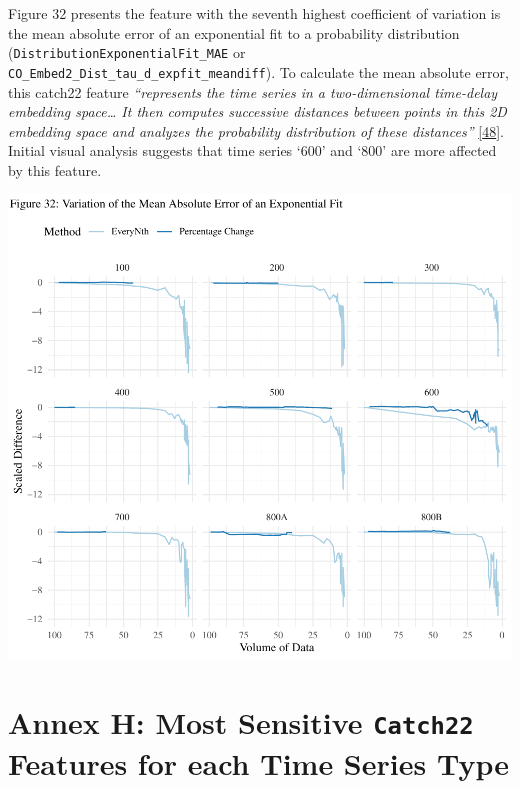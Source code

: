 \documentclass{article}
\begin{document}
\newpage

Figure 32 presents the feature with the seventh highest coefficient of
variation is the mean absolute error of an exponential fit to a
probability distribution (\texttt{DistributionExponentialFit\_MAE} or
\texttt{CO\_Embed2\_Dist\_tau\_d\_expfit\_meandiff}). To calculate the
mean absolute error, this catch22 feature \emph{``represents the time
series in a two-dimensional time-delay embedding space\ldots{} It then
computes successive distances between points in this 2D embedding space
and analyzes the probability distribution of these distances''}
\protect\hyperlink{ref-feature_book}{{[}48{]}}. Initial visual analysis
suggests that time series `600' and `800' are more affected by this
feature.

\includegraphics{210431461_CSC8639_Dissertation_files/figure-latex/MAE-1.pdf}

\newpage

\hypertarget{annex-h-most-sensitive-catch22-features-for-each-time-series-type}{%
\section{\texorpdfstring{Annex H: Most Sensitive \texttt{Catch22}
Features for each Time Series
Type}{Annex H: Most Sensitive Catch22 Features for each Time Series Type}}\label{annex-h-most-sensitive-catch22-features-for-each-time-series-type}}
\end{document}
